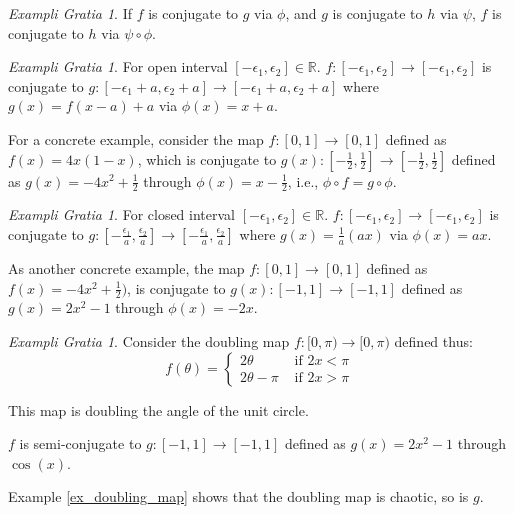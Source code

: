 \documentclass{report}
\theoremstyle{definition}
\theoremstyle{definition}
\theoremstyle{remark}
\newtheorem{example}[thm]{Exampli Gratia}
\newcommand{\bb}[1]{\mathbb{#1}} %
\begin{document}
\begin{example}
	If $f$ is conjugate to $g$ via $\phi$, and $g$ is conjugate to $h$ via $\psi$, $f$ is conjugate to $h$ via $\psi \circ \phi$.
	\begin{center}
	\end{center}
\end{example}

\begin{example}
	For open interval $[-\epsilon_1, \epsilon_2] \in \bb{R}$. 
	$f: [-\epsilon_1, \epsilon_2] \rightarrow [-\epsilon_1, \epsilon_2]$
	is conjugate to 
	$g: [-\epsilon_1 + a, \epsilon_2 + a] \rightarrow  [-\epsilon_1 + a, \epsilon_2 + a]$
	where $g(x)= f(x -a) + a$ via $\phi(x) = x + a$.

	For a concrete example, consider the map 
	$f: [0,1] \rightarrow [0,1]$
	defined as $f(x) = 4x(1-x)$,
	which is conjugate to 
	$g(x): [-\frac{1}{2}, \frac{1}{2}] \rightarrow [-\frac{1}{2}, \frac{1}{2}]$
	defined as $g(x) = -4x^2 + \frac{1}{2}$ 
	through $\phi(x) = x -\frac{1}{2}$, i.e., $ \phi \circ f=  g \circ \phi$.
\end{example}

\begin{example}
	For closed interval $[-\epsilon_1, \epsilon_2] \in \bb{R}$. 
	$f: [-\epsilon_1, \epsilon_2] \rightarrow [-\epsilon_1, \epsilon_2]$
	is conjugate to 
	$g: [-\frac{\epsilon_1}{a}, \frac{\epsilon_2}{a}] \rightarrow [-\frac{\epsilon_1}{a}, \frac{\epsilon_2}{a}]$
	where $g(x)= \frac{1}{a}(ax)$ via $\phi(x) = ax$.


	As another concrete example, the map $f: [0,1] \rightarrow [0,1]$
	defined as $f(x) = -4x^2 + \frac{1}{2})$,
	is conjugate to 
	$g(x): [-1, 1] \rightarrow [-1, 1]$
	defined as $g(x) = 2x^2 - 1$
	through $\phi(x) = -2x$.
\end{example}

\begin{example}
	Consider the doubling map $f: [0,\pi) \rightarrow [0, \pi)$ defined thus: 
	$$
	f(\theta) = 
		\begin{cases}
			2 \theta &\text{ if } 2x <  \pi \\
			2 \theta - \pi &\text{ if } 2x > \pi
		\end{cases}
	$$
	
	This map is doubling the angle of the unit circle.

	$f$ is semi-conjugate to $g: [-1, 1] \rightarrow [-1, 1]$ defined as $g(x) = 2x^2 - 1$ through $\cos(x)$.

	Example \ref{ex_doubling_map} shows that the doubling map is chaotic, so is $g$.
\end{example}
\end{document}
